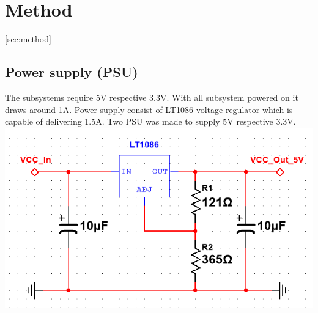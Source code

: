 \section{Method}
\ref{sec:method}


\subsection{Power supply (PSU)}
The subsystems require 5V respective 3.3V. With all subsystem powered on it draws around 1A.
Power supply consist of LT1086 voltage regulator which is capable of delivering 1.5A.
Two PSU was made to supply 5V respective 3.3V.
\includegraphics[width=\linewidth]{voltage_regulator}



